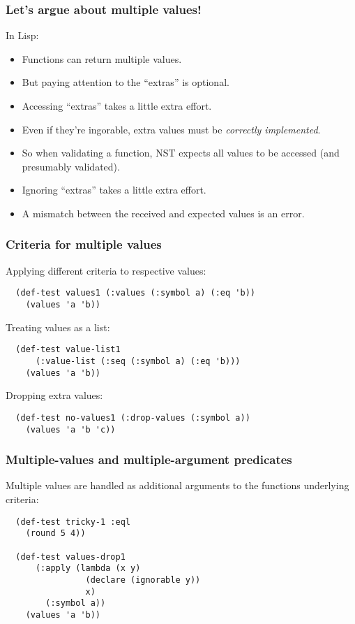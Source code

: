 \documentclass{beamer}
\begin{document}
\begin{frame}[fragile]
  \frametitle{Let's argue about multiple values!}

  In Lisp:
\begin{itemize}
\item Functions can return multiple values.
\item But paying attention to the ``extras'' is optional.
\item Accessing ``extras'' takes a little extra effort.
\end{itemize}
\begin{itemize}
\item<2-> Even if they're ingorable, extra values must be
  \emph{correctly implemented}.
\item<2-> So when validating a function, NST expects all values to be
  accessed (and presumably validated).
\item<2-> Ignoring ``extras'' takes a little extra effort.
\item<2-> A mismatch between the received and expected values is an
  error.
\end{itemize}
\end{frame}

\begin{frame}[fragile]
  \frametitle{Criteria for multiple values}
Applying different criteria to respective values:
{\small\begin{verbatim}
  (def-test values1 (:values (:symbol a) (:eq 'b))
    (values 'a 'b))
\end{verbatim}}
Treating values as a list:
{\small\begin{verbatim}
  (def-test value-list1
      (:value-list (:seq (:symbol a) (:eq 'b)))
    (values 'a 'b))
\end{verbatim}}
Dropping extra values:
{\small\begin{verbatim}
  (def-test no-values1 (:drop-values (:symbol a))
    (values 'a 'b 'c))  
\end{verbatim}}
\end{frame}

\begin{frame}[fragile]
  \frametitle{Multiple-values and multiple-argument predicates}

  Multiple values are handled as additional arguments to the functions
  underlying criteria:
{\small\begin{verbatim}
  (def-test tricky-1 :eql
    (round 5 4))

  (def-test values-drop1
      (:apply (lambda (x y)
                (declare (ignorable y))
                x)
        (:symbol a))
    (values 'a 'b))
\end{verbatim}}
\end{frame}
\end{document}

